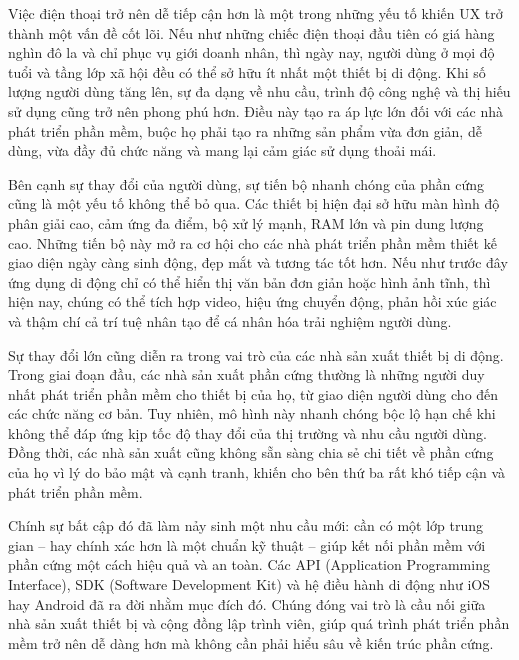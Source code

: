     \begin{flushleft}
      \hspace*{0.8cm}Việc điện thoại trở nên dễ tiếp cận hơn là một trong những yếu tố khiến UX trở thành một vấn đề cốt lõi. Nếu như những chiếc điện thoại đầu tiên có giá hàng nghìn đô la và chỉ phục vụ giới doanh nhân, thì ngày nay, người dùng ở mọi độ tuổi và tầng lớp xã hội đều có thể sở hữu ít nhất một thiết bị di động. Khi số lượng người dùng tăng lên, sự đa dạng về nhu cầu, trình độ công nghệ và thị hiếu sử dụng cũng trở nên phong phú hơn. Điều này tạo ra áp lực lớn đối với các nhà phát triển phần mềm, buộc họ phải tạo ra những sản phẩm vừa đơn giản, dễ dùng, vừa đầy đủ chức năng và mang lại cảm giác sử dụng thoải mái.
  \end{flushleft}

  \begin{flushleft}
    \hspace*{0.8cm}Bên cạnh sự thay đổi của người dùng, sự tiến bộ nhanh chóng của phần cứng cũng là một yếu tố không thể bỏ qua. Các thiết bị hiện đại sở hữu màn hình độ phân giải cao, cảm ứng đa điểm, bộ xử lý mạnh, RAM lớn và pin dung lượng cao. Những tiến bộ này mở ra cơ hội cho các nhà phát triển phần mềm thiết kế giao diện ngày càng sinh động, đẹp mắt và tương tác tốt hơn. Nếu như trước đây ứng dụng di động chỉ có thể hiển thị văn bản đơn giản hoặc hình ảnh tĩnh, thì hiện nay, chúng có thể tích hợp video, hiệu ứng chuyển động, phản hồi xúc giác và thậm chí cả trí tuệ nhân tạo để cá nhân hóa trải nghiệm người dùng.
  \end{flushleft}

  \begin{flushleft}
    \hspace*{0.8cm}Sự thay đổi lớn cũng diễn ra trong vai trò của các nhà sản xuất thiết bị di động. Trong giai đoạn đầu, các nhà sản xuất phần cứng thường là những người duy nhất phát triển phần mềm cho thiết bị của họ, từ giao diện người dùng cho đến các chức năng cơ bản. Tuy nhiên, mô hình này nhanh chóng bộc lộ hạn chế khi không thể đáp ứng kịp tốc độ thay đổi của thị trường và nhu cầu người dùng. Đồng thời, các nhà sản xuất cũng không sẵn sàng chia sẻ chi tiết về phần cứng của họ vì lý do bảo mật và cạnh tranh, khiến cho bên thứ ba rất khó tiếp cận và phát triển phần mềm.
  \end{flushleft}

  \begin{flushleft}
    \hspace*{0.8cm}Chính sự bất cập đó đã làm nảy sinh một nhu cầu mới: cần có một lớp trung gian – hay chính xác hơn là một chuẩn kỹ thuật – giúp kết nối phần mềm với phần cứng một cách hiệu quả và an toàn. Các API (Application Programming Interface), SDK (Software Development Kit) và hệ điều hành di động như iOS hay Android đã ra đời nhằm mục đích đó. Chúng đóng vai trò là cầu nối giữa nhà sản xuất thiết bị và cộng đồng lập trình viên, giúp quá trình phát triển phần mềm trở nên dễ dàng hơn mà không cần phải hiểu sâu về kiến trúc phần cứng.
  \end{flushleft}

